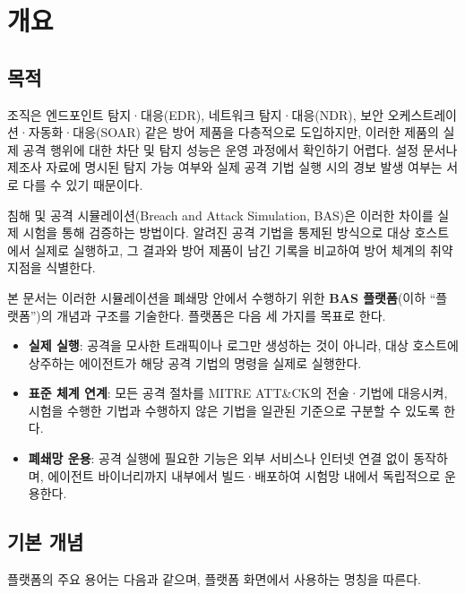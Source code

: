 \section{개요}\label{sec:overview}

\subsection{목적}\label{subsec:purpose}

조직은 엔드포인트 탐지·대응(EDR), 네트워크 탐지·대응(NDR), 보안 오케스트레이션·자동화·대응(SOAR) 같은 방어 제품을 다층적으로 도입하지만, 이러한 제품의 실제 공격 행위에 대한 차단 및 탐지 성능은 운영 과정에서 확인하기 어렵다.
설정 문서나 제조사 자료에 명시된 탐지 가능 여부와 실제 공격 기법 실행 시의 경보 발생 여부는 서로 다를 수 있기 때문이다.

침해 및 공격 시뮬레이션(Breach and Attack Simulation, BAS)은 이러한 차이를 실제 시험을 통해 검증하는 방법이다.
알려진 공격 기법을 통제된 방식으로 대상 호스트에서 실제로 실행하고, 그 결과와 방어 제품이 남긴 기록을 비교하여 방어 체계의 취약 지점을 식별한다.

본 문서는 이러한 시뮬레이션을 폐쇄망 안에서 수행하기 위한 \textbf{BAS 플랫폼}(이하 ``플랫폼'')의 개념과 구조를 기술한다.
플랫폼은 다음 세 가지를 목표로 한다.

\begin{itemize}
    \item \textbf{실제 실행}: 공격을 모사한 트래픽이나 로그만 생성하는 것이 아니라, 대상 호스트에 상주하는 에이전트가 해당 공격 기법의 명령을 실제로 실행한다.
    \item \textbf{표준 체계 연계}: 모든 공격 절차를 MITRE ATT\&CK의 전술·기법에 대응시켜, 시험을 수행한 기법과 수행하지 않은 기법을 일관된 기준으로 구분할 수 있도록 한다.
    \item \textbf{폐쇄망 운용}: 공격 실행에 필요한 기능은 외부 서비스나 인터넷 연결 없이 동작하며, 에이전트 바이너리까지 내부에서 빌드·배포하여 시험망 내에서 독립적으로 운용한다.
\end{itemize}

\subsection{기본 개념}\label{subsec:concepts}

플랫폼의 주요 용어는 다음과 같으며, 플랫폼 화면에서 사용하는 명칭을 따른다.

